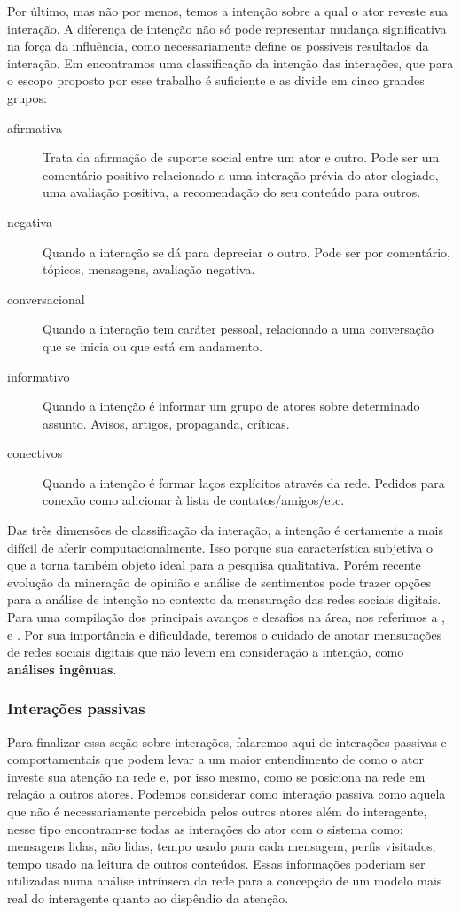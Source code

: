 \documentclass{article}
\begin{document}
Por último, mas não por menos, temos a intenção sobre a qual o ator reveste sua
interação. A diferença de intenção não só pode representar mudança significativa
na força da influência, como necessariamente define os possíveis resultados da
interação. Em \cite{Recuero2008} encontramos uma classificação da intenção
das interações, que para o escopo proposto por esse trabalho é suficiente e as
divide em cinco grandes grupos:
\begin{description}
\item[afirmativa] Trata da afirmação de suporte social entre um ator e outro.
Pode ser um comentário positivo relacionado a uma interação prévia do ator
elogiado, uma avaliação positiva, a recomendação do seu conteúdo para outros.
\item[negativa] Quando a interação se dá para depreciar o outro. Pode ser por
comentário, tópicos, mensagens, avaliação negativa.
\item[conversacional] Quando a interação tem caráter pessoal, relacionado a uma
conversação que se inicia ou que está em andamento.
\item[informativo] Quando a intenção é informar um grupo de atores sobre
determinado assunto. Avisos, artigos, propaganda, críticas.
\item[conectivos] Quando a intenção é formar laços explícitos através da rede.
Pedidos para conexão como adicionar à lista de contatos/amigos/etc.
\end{description}
Das três dimensões de classificação da interação, a intenção é certamente a mais
difícil de aferir computacionalmente. Isso porque sua característica subjetiva o
que a torna também objeto ideal para a pesquisa qualitativa. Porém recente
evolução da mineração de opinião e análise de sentimentos pode trazer opções
para a análise de intenção no contexto da mensuração das redes sociais digitais.
Para uma compilação dos principais avanços e desafios na área, nos referimos a
\cite{Wilson2005}, \cite{Ding2007} e \cite{Pang2008}. Por sua importância e
dificuldade, teremos o cuidado de anotar mensurações de redes sociais digitais
que não levem em consideração a intenção, como \textbf{análises ingênuas}.

\subsubsection{Interações passivas}

Para finalizar essa seção sobre interações, falaremos aqui de interações passivas
e comportamentais que podem levar a um maior entendimento de como o ator investe
sua atenção na rede e, por isso mesmo, como se posiciona na rede em relação a
outros atores. Podemos considerar como interação passiva como aquela que não é
necessariamente percebida pelos outros atores além do interagente, nesse tipo
encontram-se todas as interações do ator com o sistema como: mensagens lidas, não
lidas, tempo usado para cada mensagem, perfis visitados, tempo usado na leitura
de outros conteúdos. Essas informações poderiam ser utilizadas numa análise
intrínseca da rede para a concepção de um modelo mais real do interagente quanto
ao dispêndio da atenção.
\end{document}
